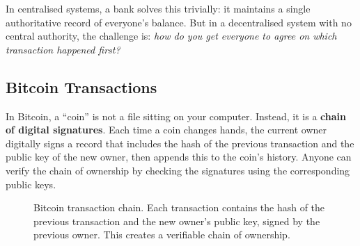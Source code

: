 In centralised systems, a bank solves this trivially: it maintains a single authoritative record of everyone's balance. But in a decentralised system with no central authority, the challenge is: \emph{how do you get everyone to agree on which transaction happened first?}

\subsection{Bitcoin Transactions}
\label{sec:btc-transactions}

In Bitcoin, a ``coin'' is not a file sitting on your computer. Instead, it is a \textbf{chain of digital signatures}. Each time a coin changes hands, the current owner digitally signs a record that includes the hash of the previous transaction and the public key of the new owner, then appends this to the coin's history. Anyone can verify the chain of ownership by checking the signatures using the corresponding public keys.

\begin{figure}[htbp]
\centering
{}
\caption{Bitcoin transaction chain. Each transaction contains the hash of the previous transaction and the new owner's public key, signed by the previous owner. This creates a verifiable chain of ownership.}
\label{fig:btc-tx-chain}
\end{figure}

